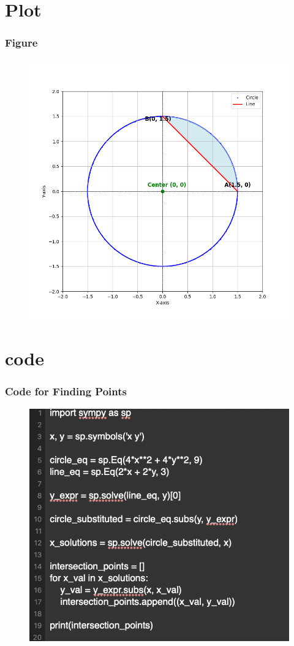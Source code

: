 \documentclass{beamer}
\theoremstyle{remark}
\begin{document}
\section{Plot}
\begin{frame}
\frametitle{Figure}
\begin{figure}[h!]
   \centering
   \includegraphics[width=0.7\linewidth]{figs/plot.png}
   \caption{ }
   \label{plot}
\end{figure}
\end{frame}
\section{code}
\begin{frame}
\frametitle{Code for Finding Points}
\begin{figure}[h!]
   \centering
   \includegraphics[width=0.7\linewidth]{figs/fig2.png}
   \caption{ }
   \label{code}
\end{figure}
\end{frame}
\end{document}
